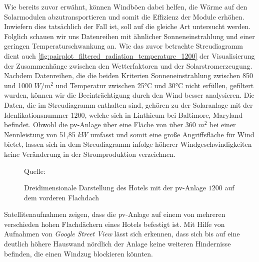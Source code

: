 \documentclass[12pt, a4paper]{article}
\begin{document}
Wie bereits zuvor erwähnt, können Windböen dabei helfen, die Wärme auf den Solarmodulen abzutransportieren und somit die Effizienz der Module erhöhen. Inwiefern dies tatsächlich der Fall ist, soll auf die gleiche Art untersucht werden. Folglich schauen wir uns Datenreihen mit ähnlicher Sonneneinstrahlung und einer geringen Temperaturschwankung an. Wie das zuvor betrachte Streudiagramm dient auch \autoref{fig:pairplot_filtered_radiation_temperature_1200} der Visualisierung der Zusammenhänge zwischen den Wetterfaktoren und der Solarstromerzeugung. Nachdem Datenreihen, die die beiden Kriterien Sonneneinstrahlung zwischen 850 und 1000 $W/ m^2$ und Temperatur zwischen 25°C und 30°C nicht erfüllen, gefiltert wurden, können wir die Beeinträchtigung durch den Wind besser analysieren. Die Daten, die im Streudiagramm enthalten sind, gehören zu der Solaranlage mit der Idenfikationsnummer $1200$, welche sich in Linthicum bei Baltimore, Maryland befindet. Obwohl die \ac{pv}-Anlage über eine Fläche von über 360 $m^2$ bei einer Nennleistung von 51,85 $kW$ umfasst und somit eine große Angriffsfläche für Wind bietet, lassen sich in dem Streudiagramm infolge höherer Windgeschwindigkeiten keine Veränderung in der Stromproduktion verzeichnen. 


\begin{figure}
\centering
\def\svgwidth{425pt}

\captionsetup{justification=raggedleft,singlelinecheck=false,skip=0pt}
\caption*{\scriptsize{Quelle: \cite{pic:googlemaps}}}
\captionsetup{justification=centering,singlelinecheck=false,skip=15pt}
\caption{Dreidimensionale Darstellung des Hotels mit der \ac{pv}-Anlage $1200$ auf dem vorderen Flachdach}
\label{pic:solarsystem_1200_picture}
\end {figure}

Satellitenaufnahmen zeigen, dass die \ac{pv}-Anlage auf einem von mehreren verschieden hohen Flachdächern eines Hotels befestigt ist. Mit Hilfe von Aufnahmen von \textit{Google Street View} lässt sich erkennen, dass sich bis auf eine deutlich höhere Hauswand nördlich der Anlage keine weiteren Hindernisse befinden, die einen Windzug blockieren könnten.
\end{document}
